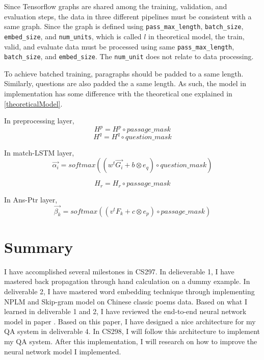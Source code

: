 \documentclass[12pt]{article}
\begin{document}
Since Tensorflow graphs are shared among the training, validation, and evaluation steps, the data in three different pipelines must be consistent with a same graph. Since the graph is defined using \texttt{pass\_max\_length}, \texttt{batch\_size}, \texttt{embed\_size}, and \texttt{num\_units}, which is called $l$ in theoretical model, the train, valid, and evaluate data must be processed using same \texttt{pass\_max\_length}, \texttt{batch\_size}, and \texttt{embed\_size}. The \texttt{num\_unit} does not relate to data processing.


To achieve batched training, paragraphs should be padded to a same length. Similarly, questions are also padded the a same length. As such, the model in implementation has some difference with the theoretical one explained in \ref{theoreticalModel}.

In preprocessing layer,
$$H^p = H^p \circ passage\_mask$$
$$H^q = H^q \circ question\_mask$$

In match-LSTM layer,
$$\overrightarrow{\alpha _i} = softmax( (w^t\overrightarrow{G_i} + b \otimes e_q) \circ question\_mask)$$


$$H_r = H_r \circ passage\_mask$$

In Ans-Ptr layer,
$$\overrightarrow{\beta _k} = softmax( (v^tF_k + c \otimes e_p) \circ passage\_mask)$$



\section{Summary}\label{sec:summary}

I have accomplished several milestones in CS297. In delieverable 1, I have mastered back propagation through hand calculation on a dummy example. In deliverable 2, I have mastered word embedding technique through implementing NPLM and Skip-gram model on Chinese classic poems data. Based on what I learned in deliverable 1 and 2, I have reviewed the end-to-end neural network model in paper \cite{wang2016machine}. Based on this paper, I have designed a nice architecture for my QA system in deliverable 4. In CS298, I will follow this architecture to implement my QA system. After this implementation, I will research on how to improve the neural network model I implemented.

\break



\printbibliography[heading=bibintoc,title={References}]
\end{document}
